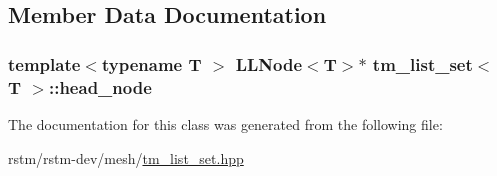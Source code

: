 \subsection{Member Data Documentation}
\hypertarget{classtm__list__set_add7bec95ca62fae4d4e0d4421c7c3dde}{
\subsubsection[{head\-\_\-node}]{\setlength{\rightskip}{0pt plus 5cm}template$<$typename T $>$ {\bf L\-L\-Node}$<$T$>$$\ast$ {\bf tm\-\_\-list\-\_\-set}$<$ T $>$\-::head\-\_\-node\hspace{0.3cm}{\ttfamily [private]}}}\label{classtm__list__set_add7bec95ca62fae4d4e0d4421c7c3dde}


The documentation for this class was generated from the following file\-:\begin{DoxyCompactItemize}
\item 
rstm/rstm-\/dev/mesh/\hyperlink{tm__list__set_8hpp}{tm\-\_\-list\-\_\-set.\-hpp}\end{DoxyCompactItemize}
